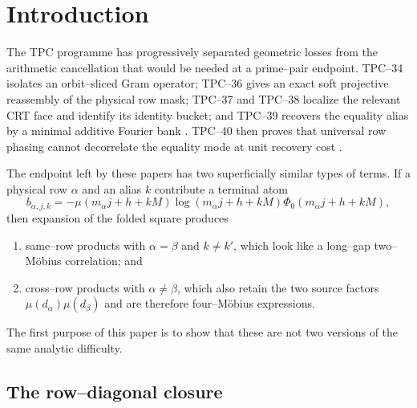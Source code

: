 \section{Introduction}
\label{sec:tpc41-introduction}

The TPC programme has progressively separated geometric losses from the
arithmetic cancellation that would be needed at a prime--pair endpoint.
TPC--34 isolates an orbit--sliced Gram operator; TPC--36 gives an exact
soft projective reassembly of the physical row mask; TPC--37 and TPC--38
localize the relevant CRT face and identify its identity bucket; and
TPC--39 recovers the equality alias by a minimal additive Fourier bank
\citep{WangTPC34,WangTPC36,WangTPC37,WangTPC38,WangTPC39}.  TPC--40 then
proves that universal row phasing cannot decorrelate the equality mode at
unit recovery cost \citep{WangTPC40}.

The endpoint left by these papers has two superficially similar types of
terms.  If a physical row \(\alpha\) and an alias \(k\) contribute a
terminal atom
\begin{equation}
 b_{\alpha,j,k}
 =-\mu(m_\alpha j+h+kM)
   \log(m_\alpha j+h+kM)
   \Phi_0(m_\alpha j+h+kM),
 \label{eq:tpc41-intro-terminal-atom}
\end{equation}
then expansion of the folded square produces
\begin{enumerate}[label=(\roman*)]
 \item same--row products with \(\alpha=\beta\) and \(k\ne k'\), which
 look like a long--gap two--M\"obius correlation; and
 \item cross--row products with \(\alpha\ne\beta\), which also retain
 the two source factors \(\mu(d_\alpha)\mu(d_\beta)\) and are therefore
 four--M\"obius expressions.
\end{enumerate}
The first purpose of this paper is to show that these are not two versions
of the same analytic difficulty.

\subsection{The row--diagonal closure}


